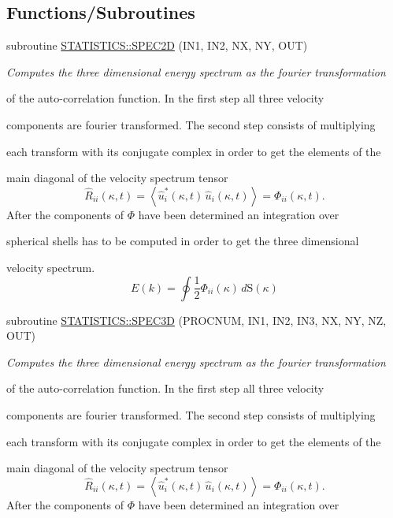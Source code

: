 \subsection*{Functions/Subroutines}
\begin{DoxyCompactItemize}
\item 
subroutine \hyperlink{namespaceSTATISTICS_a4a3e7e4d1eb020e1128c01e60da55ead}{STATISTICS::SPEC2D} (IN1, IN2, NX, NY, OUT)
\begin{DoxyCompactList}\small\item\em Computes the three dimensional energy spectrum as the fourier transformation\par
 of the auto-\/correlation function. In the first step all three velocity\par
 components are fourier transformed. The second step consists of multiplying\par
 each transform with its conjugate complex in order to get the elements of the\par
 main diagonal of the velocity spectrum tensor \[\hat{R}_{ii}\left(\kappa,t\right)= \left<\hat{u}_i^{*}\left(\kappa,t\right)\,\hat{u}_i\left(\kappa,t\right)\right>= \Phi_{ii}\left(\kappa,t\right).\] After the components of $\Phi$ have been determined an integration over\par
 spherical shells has to be computed in order to get the three dimensional\par
 velocity spectrum. \[ E(k)=\oint\frac{1}{2}\Phi_{ii}(\kappa)\,d\mathrm{S}(\kappa) \] \end{DoxyCompactList}\item 
subroutine \hyperlink{namespaceSTATISTICS_abb792b2e62e57165b7e93764e07d1100}{STATISTICS::SPEC3D} (PROCNUM, IN1, IN2, IN3, NX, NY, NZ, OUT)
\begin{DoxyCompactList}\small\item\em Computes the three dimensional energy spectrum as the fourier transformation\par
 of the auto-\/correlation function. In the first step all three velocity\par
 components are fourier transformed. The second step consists of multiplying\par
 each transform with its conjugate complex in order to get the elements of the\par
 main diagonal of the velocity spectrum tensor \[\hat{R}_{ii}\left(\kappa,t\right)= \left<\hat{u}_i^{*}\left(\kappa,t\right)\,\hat{u}_i\left(\kappa,t\right)\right>= \Phi_{ii}\left(\kappa,t\right).\] After the components of $\Phi$ have been determined an integration over\par

\end{DoxyCompactList}
\end{DoxyCompactItemize}

